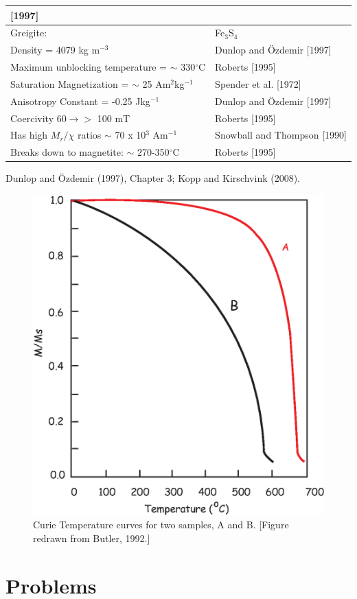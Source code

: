 \begin{center}
\begin{longtable}{ll}
[1997]\\
\hline
{Greigite:}&Fe$_3$S$_4$\\
Density = 4079 kg m$^{-3}$& Dunlop and \"Ozdemir [1997]\\
Maximum unblocking temperature = $\sim$ 330$^{\circ}$C&Roberts [1995]\\
{Saturation Magnetization} = $\sim$ 25 Am$^2$kg$^{-1}$&Spender et al. [1972]\\
{Anisotropy Constant}  = -0.25 {Jkg}$^{-1}$&Dunlop and \"Ozdemir
[1997]\\
{Coercivity 60$\rightarrow >$ 100 mT}& Roberts [1995]\\
Has high $M_r/\chi$ ratios $\sim$ 70 x 10$^3$ Am$^{-1}$& Snowball and Thompson
[1990]\\ 
{Breaks down to magnetite:}
 $\sim$ 270-350$^{\circ}$C&Roberts [1995]\\
\end{longtable}
\end{center}

 Dunlop and \"Ozdemir (1997), Chapter 3;  
 Kopp and Kirschvink (2008). \nocite{kopp08}


\begin{figure}[htb]
\includegraphics[width=3 cm]{EPSfiles/problem1.eps}
\caption{Curie Temperature curves for two samples, A and B. [Figure redrawn from Butler, 1992.]}
\label{fig:prob1}
\end{figure}

\clearpage

\nocite{butler92}
\section{Problems}




